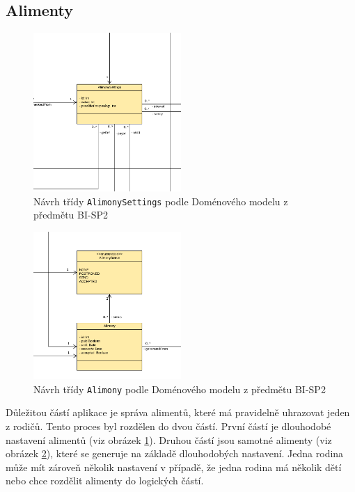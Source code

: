     \subsection{Alimenty}
        \begin{figure}\centering
	        \includegraphics[width=0.5\textwidth]{pdfs/AlimonySettings1}
	        \caption[Návrh AlimonySettings]{Návrh třídy \texttt{AlimonySettings} podle Doménového modelu z předmětu BI-SP2}\label{image:AlimonySettings1}
        \end{figure}
        \begin{figure}\centering
	        \includegraphics[width=0.5\textwidth]{pdfs/Alimony1}
	        \caption[Návrh Alimony]{Návrh třídy \texttt{Alimony} podle Doménového modelu z předmětu BI-SP2}\label{image:Alimony1}
        \end{figure}
        Důležitou částí aplikace je správa alimentů, které má pravidelně uhrazovat jeden z rodičů. Tento proces byl rozdělen do dvou částí. První částí je dlouhodobé nastavení alimentů (viz obrázek \ref{image:AlimonySettings1}). Druhou částí jsou samotné alimenty (viz obrázek \ref{image:Alimony1}), které se generuje na základě dlouhodobých nastavení. Jedna rodina může mít zároveň několik nastavení v případě, že jedna rodina má několik dětí nebo chce rozdělit alimenty do logických částí.
        
